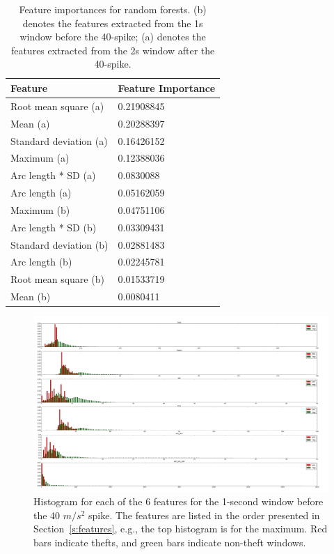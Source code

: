 \documentclass{soups}
\begin{document}
\begin{table}[t]
\centering
\begin{tabular}{@{}ll@{}}
\toprule
Feature                & Feature Importance \\ \midrule
Root mean square (a)   & 0.21908845         \\
Mean (a)               & 0.20288397         \\
Standard deviation (a) & 0.16426152         \\
Maximum (a)            & 0.12388036         \\
Arc length * SD (a)    & 0.0830088          \\
Arc length (a)         & 0.05162059         \\
Maximum (b)            & 0.04751106         \\
Arc length * SD (b)    & 0.03309431         \\
Standard deviation (b) & 0.02881483         \\
Arc length (b)         & 0.02245781         \\
Root mean square (b)   & 0.01533719         \\
Mean (b)               & 0.0080411          \\ \bottomrule
\end{tabular}
\caption{Feature importances for random forests. (b) denotes the features extracted from the 1s window before the 40-spike; (a) denotes the features extracted from the 2s window after the 40-spike.}
\label{tbl:importance-rf}
\end{table}

\begin{figure}[t]
\begin{center}
\includegraphics[width=\textwidth]{hist_features_before_win_size_1_2.png}
\end{center}
\caption{Histogram for each of the 6 features for the 1-second window before the 40 $m/s^2$ spike.  The features are listed in the order presented in Section~\ref{s:features}, e.g., the top histogram is for the maximum.  Red bars indicate thefts, and green bars indicate non-theft windows.}
\label{fig:beforehist}
\end{figure}
\end{document}
